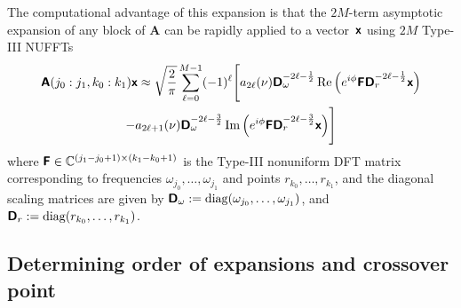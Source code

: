 The computational advantage of this expansion is that the $2M$-term asymptotic
expansion of any block of $\bm{A}$ can be rapidly applied to a vector~$\bm{\mathsf{x}}$ using $2M$
Type-III NUFFTs
\begin{multline}
    \bm{\mathsf{A}}(j_0:j_1, k_0:k_1) \bm{\mathsf{x}} 
    \approx \sqrt{\frac{2}{\pi}} \sum_{\ell=0}^{M-1} (-1)^\ell \Bigg[ 
        a_{2\ell}(\nu) \bm{\mathsf{D}}_\omega^{-2\ell-\frac{1}{2}} \operatorname*{Re}\Big(e^{i\phi}
                                                             \bm{\mathsf{F}}
                                                             \bm{\mathsf{D}}_r^{-2\ell-\frac{1}{2}}
                                                             \bm{\mathsf{x}} \Big) \\
        - a_{2\ell+1}(\nu) \bm{\mathsf{D}}_\omega^{-2\ell-\frac{3}{2}}
                                                             \operatorname*{Im}\Big(e^{i\phi}
                                                               \bm{\mathsf{F}}
                                                               \bm{\mathsf{D}}_r^{-2\ell-\frac{3}{2}}
                                                               \bm{\mathsf{x}} \Big) 
    \Bigg]
\end{multline}
where $\bm{\mathsf{F}} \in \mathbb{C}^{(j_1 - j_0 + 1) \times (k_1 - k_0 + 1)}$ is the Type-III
nonuniform DFT matrix corresponding to frequencies $\omega_{j_0}, \dots,
\omega_{j_1}$ and points $r_{k_0}, \dots, r_{k_1}$, and the diagonal scaling
matrices are given by $\bm{\mathsf{D}}_\omega :=
\operatorname{diag}(\omega_{j_0},\dots,\omega_{j_1})$, and $\bm{\mathsf{D}}_r :=
\operatorname{diag}(r_{k_0},\dots,r_{k_1})$.





\subsection{Determining order of expansions and crossover point}
\label{sec:cutoff}


